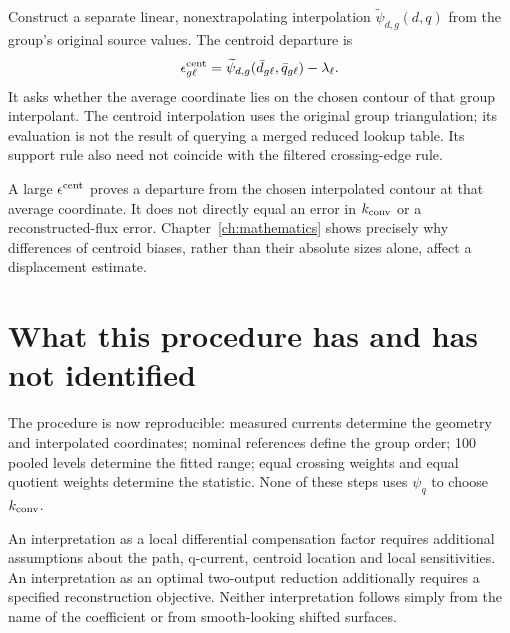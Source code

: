 Construct a separate linear, nonextrapolating interpolation $\widetilde\psi_{d,g}(d,q)$ from the group's original source values. The centroid departure is
\begin{equation}\label{eq:centroid-departure}
\epsilon^{\rm cent}_{g\ell}
=\widetilde\psi_{d,g}(\bar d_{g\ell},\bar q_{g\ell})-\lambda_\ell.
\end{equation}
It asks whether the average coordinate lies on the chosen contour of that group interpolant. The centroid interpolation uses the original group triangulation; its evaluation is not the result of querying a merged reduced lookup table. Its support rule also need not coincide with the filtered crossing-edge rule.

A large $\epsilon^{\rm cent}$ proves a departure from the chosen interpolated contour at that average coordinate. It does not directly equal an error in $k_{\rm conv}$ or a reconstructed-flux error. Chapter~\ref{ch:mathematics} shows precisely why differences of centroid biases, rather than their absolute sizes alone, affect a displacement estimate.

\section{What this procedure has and has not identified}
The procedure is now reproducible: measured currents determine the geometry and interpolated coordinates; nominal references define the group order; 100 pooled levels determine the fitted range; equal crossing weights and equal quotient weights determine the statistic. None of these steps uses $\psi_q$ to choose $k_{\rm conv}$.

An interpretation as a local differential compensation factor requires additional assumptions about the path, q-current, centroid location and local sensitivities. An interpretation as an optimal two-output reduction additionally requires a specified reconstruction objective. Neither interpretation follows simply from the name of the coefficient or from smooth-looking shifted surfaces.
